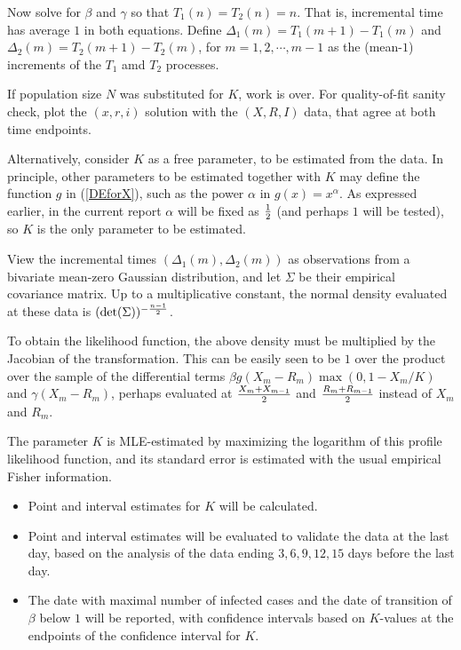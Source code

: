 \documentclass{article}
\begin{document}
Now solve for $\beta$ and $\gamma$ so that $T_1(n)=T_2(n)=n$. That is, incremental time has average $1$ in both equations. Define $\Delta_1(m)=T_1(m+1)-T_1(m)$ and $\Delta_2(m)=T_2(m+1)-T_2(m)$, for $m=1, 2, \cdots,m-1$ as the (mean-$1$) increments of the $T_1$ amd $T_2$ processes.

\bigskip

If population size $N$ was substituted for $K$, work is over. For quality-of-fit sanity check, plot the $(x,r,i)$ solution with the $(X,R,I)$ data, that agree at both time endpoints.

Alternatively, consider $K$ as a free parameter, to be estimated from the data. In principle, other parameters to be estimated together with $K$ may define the function $g$ in (\ref{DEforX}), such as the power $\alpha$ in $g(x)=x^\alpha$. As expressed earlier, in the current report $\alpha$ will be fixed as ${1 \over 2}$ (and perhaps  $1$ will be tested), so $K$ is the only parameter to be estimated.

\bigskip

View the incremental times $(\Delta_1(m),\Delta_2(m))$ as observations from a bivariate mean-zero Gaussian distribution, and let $\Sigma$ be their empirical covariance matrix. Up to a multiplicative constant, the normal density evaluated at these data is $(\det(\Sigma))^{-{{n-1} \over 2}}$.

To obtain the likelihood function, the above density must be multiplied by the Jacobian of the transformation. This can be easily seen to be $1$ over the product over the sample of the differential terms $\beta g(X_m-R_m)\max(0,1-X_m/K)$ and $\gamma (X_m-R_m)$, perhaps evaluated at
${{X_m+X_{m-1}} \over 2}$ and ${{R_m+R_{m-1}} \over 2}$ instead of $X_m$ and $R_m$.

\bigskip

The parameter $K$ is MLE-estimated by maximizing the logarithm of this profile likelihood function, and its standard error is estimated with the usual empirical Fisher information.

\begin{itemize}

\item Point and interval estimates for $K$ will be calculated.

\item Point and interval estimates will be evaluated to validate the data at the last day, based on the analysis of the data ending $3,6,9,12,15$ days before the last day.

\item The date with maximal number of infected cases and the date of transition of $\beta$ below $1$ will be reported, with confidence intervals based on $K$-values at the endpoints of the confidence interval for $K$.

\end{itemize}
\end{document}
